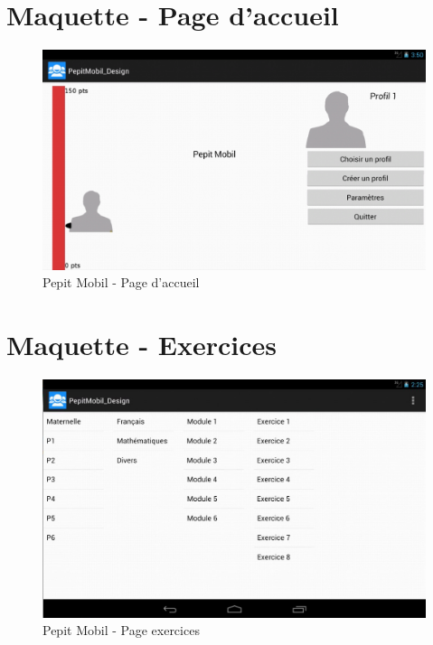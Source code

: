 \section*{Maquette - Page d'accueil}
\begin{figure}[H]
\begin{center}
\includegraphics[width=15cm]{images/maquettes_homePage}
\end{center}
\caption{Pepit Mobil - Page d'accueil}
\label{Pepit Mobil - Page d'accueil}
\end{figure}

\section*{Maquette - Exercices}
\begin{figure}[H]
\begin{center}
\includegraphics[width=15cm]{images/maquettes_exercices}
\end{center}
\caption{Pepit Mobil - Page exercices}
\label{Pepit Mobil - Page exercices}
\end{figure}

